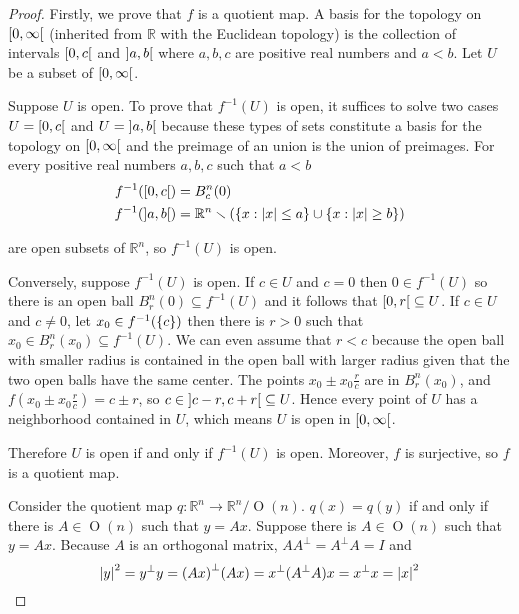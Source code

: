 \begin{proof}
	Firstly, we prove that $f$ is a quotient map. A basis for the topology on $\left[{0, \infty}\right[$ (inherited from $\mathbb{R}$ with the Euclidean topology) is the collection of intervals $\left[{0, c}\right[$ and $\left]{a, b}\right[$ where $a, b, c$ are positive real numbers and $a < b$. Let $U$ be a subset of $\left[{0, \infty}\right[$.

	Suppose $U$ is open. To prove that $f^{-1}(U)$ is open, it suffices to solve two cases $U = \left[{0, c}\right[$ and $U = \left]{a, b}\right[$ because these types of sets constitute a basis for the topology on $\left[{0, \infty}\right[$ and the preimage of an union is the union of preimages. For every positive real numbers $a, b, c$ such that $a < b$
	\begin{align*}
		f^{-1}(\left[{0, c}\right[) & = B^{n}_{c}(0)                                                                                           \\
		f^{-1}(\left]{a, b}\right[)  & = \mathbb{R}^{n} \smallsetminus \left( \left\{{x : \left\vert{x}\right\vert \leq a }\right\} \cup \left\{{ x : \left\vert{x}\right\vert \geq b }\right\} \right)
	\end{align*}

	are open subsets of $\mathbb{R}^{n}$, so $f^{-1}(U)$ is open.

	Conversely, suppose $f^{-1}(U)$ is open. If $c\in U$ and $c = 0$ then $0 \in f^{-1}(U)$ so there is an open ball $B^{n}_{r}(0) \subseteq f^{-1}(U)$ and it follows that $\left[{0, r}\right[ \subseteq U$. If $c\in U$ and $c \ne 0$, let $x_{0} \in f^{-1}(\left\{{c}\right\})$ then there is $r > 0$ such that $x_{0} \in B^{n}_{r}(x_{0}) \subseteq f^{-1}(U)$. We can even assume that $r < c$ because the open ball with smaller radius is contained in the open ball with larger radius given that the two open balls have the same center. The points $x_{0} \pm x_{0}\frac{r}{c}$ are in $B^{n}_{r}(x_{0})$, and $f\left(x_{0} \pm x_{0}\frac{r}{c}\right) = c \pm r$, so $c \in \left]{c - r, c + r}\right[ \subseteq U$. Hence every point of $U$ has a neighborhood contained in $U$, which means $U$ is open in $\left[{0, \infty}\right[$.

	Therefore $U$ is open if and only if $f^{-1}(U)$ is open. Moreover, $f$ is surjective, so $f$ is a quotient map.

	Consider the quotient map $q: \mathbb{R}^{n} \to \mathbb{R}^{n}/\operatorname{O}(n)$. $q(x) = q(y)$ if and only if there is $A \in \operatorname{O}(n)$ such that $y = Ax$. Suppose there is $A \in \operatorname{O}(n)$ such that $y = Ax$. Because $A$ is an orthogonal matrix, $AA^{\bot} = A^{\bot}A = I$ and
	\begin{equation*}
		\left\vert{y}\right\vert^{2} = y^{\bot}y = {(Ax)}^{\bot}(Ax) = x^{\bot}(A^{\bot}A)x = x^{\bot}x = \left\vert{x}\right\vert^{2}
	\end{equation*}


\end{proof}
